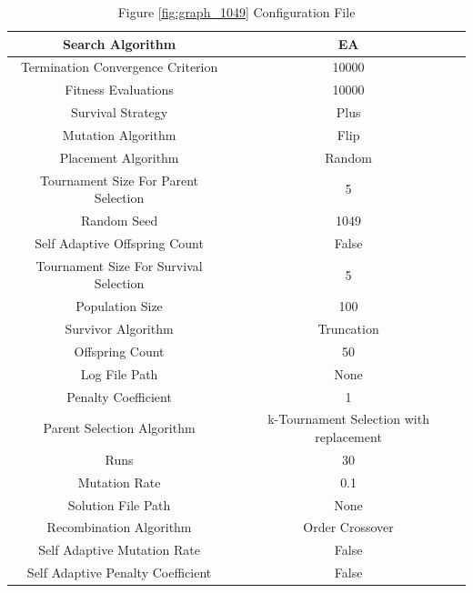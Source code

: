 \documentclass{standalone}
\begin{document}
\begin{table}[!htb]
	\centering
	\caption{Figure \ref{fig:graph_1049} Configuration File}
	\label{tab:graph_1049}
	\begin{tabular}{| c | c |}
		\hline
		Search Algorithm		& EA		 \\
		\hline
		Termination Convergence Criterion		& 10000		 \\
		\hline
		Fitness Evaluations		& 10000		 \\
		\hline
		Survival Strategy		& Plus		 \\
		\hline
		Mutation Algorithm		& Flip		 \\
		\hline
		Placement Algorithm		& Random		 \\
		\hline
		Tournament Size For Parent Selection		& 5		 \\
		\hline
		Random Seed		& 1049		 \\
		\hline
		Self Adaptive Offspring Count		& False		 \\
		\hline
		Tournament Size For Survival Selection		& 5		 \\
		\hline
		Population Size		& 100		 \\
		\hline
		Survivor Algorithm		& Truncation		 \\
		\hline
		Offspring Count		& 50		 \\
		\hline
		Log File Path		& None		 \\
		\hline
		Penalty Coefficient		& 1		 \\
		\hline
		Parent Selection Algorithm		& k-Tournament Selection with replacement		 \\
		\hline
		Runs		& 30		 \\
		\hline
		Mutation Rate		& 0.1		 \\
		\hline
		Solution File Path		& None		 \\
		\hline
		Recombination Algorithm		& Order Crossover		 \\
		\hline
		Self Adaptive Mutation Rate		& False		 \\
		\hline
		Self Adaptive Penalty Coefficient		& False		 \\
		\hline
	\end{tabular}
\end{table}
\end{document}
